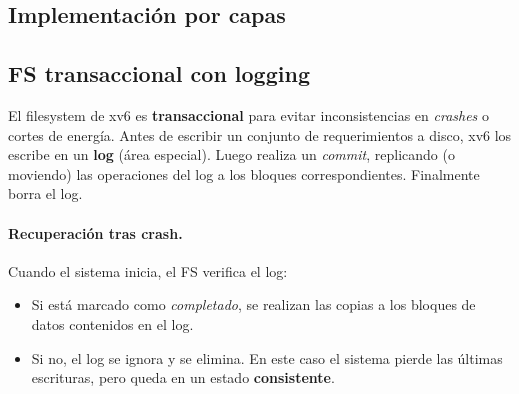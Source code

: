 \documentclass[11pt,a4paper]{article}
\begin{document}
\subsection{Implementación por capas}

\begin{center}
\end{center}

\subsection{FS transaccional con logging}

\begin{importante}
El filesystem de xv6 es \textbf{transaccional} para evitar
inconsistencias en \emph{crashes} o cortes de energía. Antes de escribir
un conjunto de requerimientos a disco, xv6 los escribe en un
\textbf{log} (área especial). Luego realiza un \emph{commit},
replicando (o moviendo) las operaciones del log a los bloques
correspondientes. Finalmente borra el log.
\end{importante}

\paragraph{Recuperación tras crash.}
Cuando el sistema inicia, el FS verifica el log:

\begin{itemize}[leftmargin=*,nosep]
    \item Si está marcado como \emph{completado}, se realizan las
        copias a los bloques de datos contenidos en el log.
    \item Si no, el log se ignora y se elimina. En este caso el
        sistema pierde las últimas escrituras, pero queda en un
        estado \textbf{consistente}.
\end{itemize}
\end{document}
